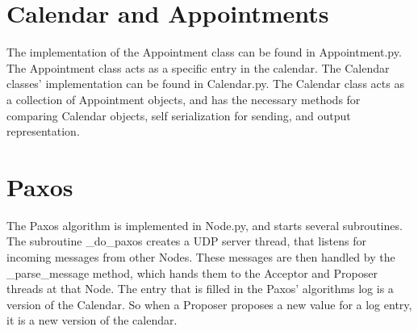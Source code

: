 \documentclass{article}
\begin{document}
	\section{Calendar and Appointments}
		The implementation of the Appointment class can be found in Appointment.py. The Appointment class acts as a specific entry in the calendar. The Calendar classes' implementation can be found in Calendar.py. The Calendar class acts as a collection of Appointment objects, and has the necessary methods for comparing Calendar objects, self serialization for sending, and output representation.

	\section{Paxos}
		The Paxos algorithm is implemented in Node.py, and starts several subroutines. The subroutine  \_do\_paxos creates a UDP server thread, that listens for incoming messages from other Nodes. These messages are then handled by the \_parse\_message method, which hands them to the Acceptor and Proposer
		threads at that Node.  The entry that is filled in the Paxos' algorithms log is a version of the Calendar. So when a Proposer proposes a new value for a log entry, it is a new version of the calendar.
\end{document}
